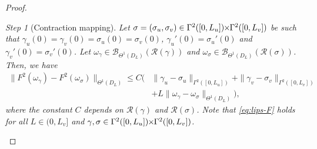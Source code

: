 \documentclass{article}
\newcommand{\RR}{\mathcal{R}}
\newcommand{\PLH}{{\mkern-1mu\times\mkern-1mu}}
\newcommand{\Times}{\PLH}
\theoremstyle{remark}
\theoremstyle{prpart}
\newtheorem{proofpart}{Step}
\newcommand{\B}{\mathcal{B}}
\begin{document}
\begin{proof}
\begin{proofpart}[Contraction mapping]
\textit{Let $\sigma=(\sigma_u,\sigma_v)\in\Gamma^2([0,L_u])\Times\Gamma^2([0,L_v])$ be such that $\gamma_u(0)=\gamma_v(0) = \sigma_u(0)=\sigma_v(0)$, $\gamma_u'(0)=\sigma_u'(0)$ and $\gamma_v'(0)=\sigma_v'(0)$. Let $\omega_\gamma\in \B_{\Theta^1(D_L)}(\RR(\gamma))$ and $\omega_\sigma\in \B_{\Theta^{1}(D_L)}(\RR(\sigma))$. Then, we have %
\begin{equation}\label{eq:lips-F}
\begin{split}
\|F^2(\omega_\gamma)-F^2(\omega_\sigma)\|_{\Theta^{1}(D_L)}\leq C\Big(&\|\gamma_u-\sigma_u\|_{\Gamma^{2}([0,L_u])} + \|\gamma_v-\sigma_v\|_{\Gamma^{2}([0,L_v])} \\
&+ L\|\omega_\gamma-\omega_\sigma\|_{\Theta^{1}(D_L)}\Big),
\end{split}
\end{equation}
where the constant $C$ depends on $\RR(\gamma)$ and $\RR(\sigma)$. Note that \eqref{eq:lips-F} holds for all $L\in(0,L_v]$ and $\gamma,\sigma\in\Gamma^{2}([0,L_u])\Times\Gamma^{2}([0,L_v])$.}


\end{proofpart}
\end{proof}
\end{document}
